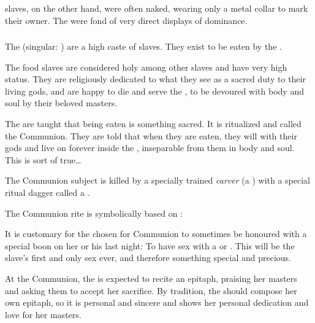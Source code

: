 \Mystraacht{} slaves, on the other hand, were often naked, wearing only a metal collar to mark their owner. 
The \Mystraacht{} were fond of very direct displays of dominance. 





\subsubsection{\Naorim}
\index{\naor}
The \naorim{} (singular: \naor) are a high caste of slaves. 
They exist to be eaten by the \resphain. 

The food slaves are considered holy among other slaves and have very high status. 
They are religiously dedicated to what they see as a sacred duty to their living gods, and are happy to die and serve the \resphain{}, to be devoured with body and soul by their beloved masters. 

The \naorim{} are taught that being eaten is something sacred. 
It is ritualized and called the Communion. 
They are told that when they are eaten, they will  with their \resphan{} gods and live on forever inside the \resphain, inseparable from them in body and soul. 
This is sort of true\ldots{}

\index{\gelveir}
The Communion subject is killed by a specially trained \emph{carver} (a \human) with a special ritual dagger called a \gelveir. 

The Communion rite is symbolically based on : 

It is customary for the \naor{} chosen for Communion to sometimes be honoured with a special boon on her or his last night: 
To have sex with a \resphan{} or \resvil. 
This will be the slave's first and only sex ever, and therefore something special and precious.  

At the Communion, the \naor{} is expected to recite an epitaph, praising her masters and asking them to accept her sacrifice. 
By tradition, the \naor{} should compose her own epitaph, so it is personal and sincere and shows her personal dedication and love for her masters. 









